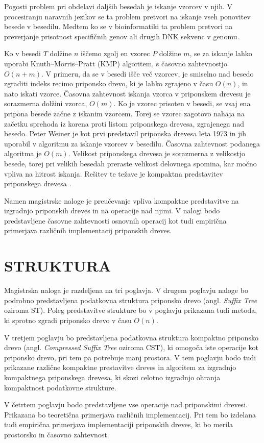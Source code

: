 Pogosti problem pri obdelavi daljših besedah je iskanje vzorcev v njih. V procesiranju naravnih jezikov se ta problem pretvori na iskanje vseh ponovitev besede v besedilu. Medtem ko se v bioinformatiki ta problem pretvori na preverjanje prisotnost specifičnih genov ali drugih DNK sekvenc v genomu. 

Ko v besedi $T$ dolžine $n$ iščemo zgolj en vzorec $P$ dolžine $m$, se za iskanje lahko uporabi Knuth–Morris–Pratt (KMP) algoritem, s časovno zahtevnostjo $O(n+m)$.  V primeru, da se v besedi išče več vzorcev, je smiselno nad besedo zgraditi indeks recimo priponsko drevo, ki je lahko zgrajeno v času $O(n)$, in nato iskati vzorce. Časovna zahtevnost iskanja vzorca v priponskem drevesu je sorazmerna dolžini vzorca, $O(m)$. Ko je vzorec prisoten v besedi, se vsaj ena pripona besede začne z iskanim vzorcem. 
Torej se vzorec zagotovo nahaja na začetku sprehoda iz korena proti listom priponskega drevesa, zgrajenega nad besedo. 
Peter Weiner je kot prvi predstavil priponska drevesa leta 1973 \cite{Weiner1973} in jih uporabil v algoritmu za iskanje vzorcev v besedilu. Časovna zahtevnost podanega algoritma je $O(m)$. Velikost priponskega drevesa je sorazmerna z velikostjo besede, torej pri velikih besedah preraste velikost delovnega spomina, kar močno vpliva na hitrost iskanja. Rešitev te težave je kompaktna predstavitev priponskega drevesa \cite{Navarro2016}.

Namen magistrske naloge je preučevanje vpliva kompaktne predstavitve na izgradnjo priponskih dreves in na operacije nad njimi. V nalogi bodo predstavljene  časovne zahtevnosti osnovnih operacij kot tudi empirična primerjava različnih implementacij priponskih dreves.

\section{STRUKTURA}\label{sec:struktura}

Magistrska naloga je razdeljena na tri poglavja. V drugem poglavju naloge bo podrobno predstavljena podatkovna struktura priponsko drevo (angl. \textit{Suffix Tree} oziroma ST). Poleg predstavitve strukture bo v poglavju prikazana tudi metoda, ki sprotno zgradi priponsko drevo v času $O(n)$.


V tretjem poglavju bo predstavljena podatkovna struktura kompaktno priponsko drevo (angl. \textit{Compressed Suffix Tree} oziroma CST), ki omogoča iste operacije kot priponsko drevo, pri tem pa potrebuje manj prostora. V tem poglavju bodo tudi prikazane različne kompaktne prestavitve dreves in algoritem za izgradnjo kompaktnega priponskega drevesa, ki skozi celotno izgradnjo ohranja kompaktnost podatkovne strukture.

V četrtem poglavju bodo predstavljene vse operacije nad priponskimi drevesi. Prikazana bo teoretična primerjava različnih implementacij. Pri tem bo izdelana tudi empirična primerjava implementaciji priponskih dreves, ki bo merila prostorsko in časovno zahtevnost.
